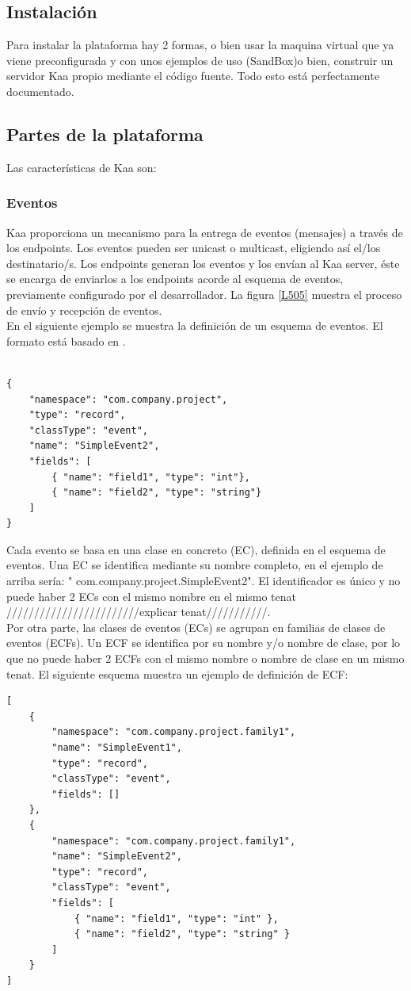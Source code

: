 \documentclass[12pt, twoside]{book}
\newcommand{\MYhref}[3][blue]{\href{#2}{\color{#1}{#3}}}
\begin{document}
\subsection{Instalación}
Para instalar la plataforma hay 2 formas, o bien usar la maquina virtual que ya viene preconfigurada y con unos ejemplos de uso (SandBox)o bien, construir un servidor Kaa propio mediante el código fuente. Todo esto está perfectamente documentado.
\subsection{Partes de la plataforma}
Las características de Kaa son:
\subsubsection*{Eventos}
Kaa proporciona un mecanismo para la entrega de eventos (mensajes) a través de los endpoints. Los eventos pueden ser unicast o multicast, eligiendo así el/los destinatario/s. Los endpoints generan los eventos y los envían al Kaa server, éste se encarga de enviarlos a los endpoints acorde al esquema de eventos, previamente configurado por el desarrollador. La figura \ref{L505} muestra el proceso de envío y recepción de eventos.\\
En el siguiente ejemplo se muestra la definición de un esquema de eventos. El formato está basado en \MYhref{http://avro.apache.org/docs/current/spec.html}{Avro Schema}.
\begin{lstlisting}

{
    "namespace": "com.company.project",
    "type": "record",
    "classType": "event",
    "name": "SimpleEvent2",
    "fields": [
        { "name": "field1", "type": "int"},
        { "name": "field2", "type": "string"}
    ]
}

\end{lstlisting}
Cada evento se basa en una clase en concreto (EC), definida en el esquema de eventos. Una EC se identifica mediante su nombre completo, en el ejemplo de arriba sería: " com.company.project.SimpleEvent2". El identificador es único y no puede haber 2 ECs con el mismo nombre en el mismo tenat ////////////////////////explicar tenat///////////.\\

Por otra parte, las clases de eventos (ECs) se agrupan en familias de clases de eventos (ECFs). Un ECF se identifica por su nombre y/o nombre de clase, por lo que no puede haber 2 ECFs con el mismo nombre o nombre de clase en un mismo tenat. El siguiente esquema muestra un ejemplo de definición de ECF:
\begin{lstlisting}
[
    {
        "namespace": "com.company.project.family1",
        "name": "SimpleEvent1",
        "type": "record",
        "classType": "event",
        "fields": []
    },
    {
        "namespace": "com.company.project.family1",
        "name": "SimpleEvent2",
        "type": "record",
        "classType": "event",
        "fields": [
            { "name": "field1", "type": "int" },
            { "name": "field2", "type": "string" }
        ]
    }
]
\end{lstlisting}
\end{document}
